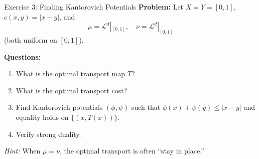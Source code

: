 \documentclass[aspectratio=169]{beamer}
\newcommand{\Ld}{\mathcal{L}^d}
\begin{document}
\begin{frame}{Exercise 3: Finding Kantorovich Potentials}
\textbf{Problem:} Let $X = Y = [0,1]$, $c(x,y) = |x-y|$, and
\[
\mu = \Ld|_{[0,1]}, \quad \nu = \Ld|_{[0,1]}
\]
(both uniform on $[0,1]$).

\vspace{0.3cm}
\textbf{Questions:}
\begin{enumerate}
    \item[(a)] What is the optimal transport map $T$?
    \item[(b)] What is the optimal transport cost?
    \item[(c)] Find Kantorovich potentials $(\phi, \psi)$ such that $\phi(x) + \psi(y) \leq |x-y|$ and equality holds on $\{(x, T(x))\}$.
    \item[(d)] Verify strong duality.
\end{enumerate}

\vspace{0.3cm}
\textit{Hint:} When $\mu = \nu$, the optimal transport is often ``stay in place.''
\end{frame}
\end{document}
